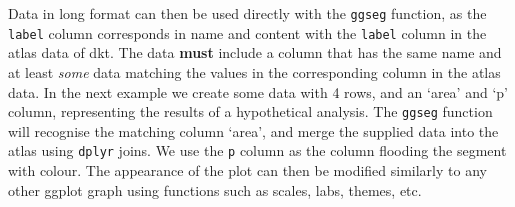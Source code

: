 \documentclass[fleqn,10pt]{wlpeerj} %
\newenvironment{Shaded}{\begin{snugshade}}{\end{snugshade}}
\newcommand{\CommentTok}[1]{\textcolor[rgb]{0.56,0.35,0.01}{\textit{#1}}}
\newcommand{\DataTypeTok}[1]{\textcolor[rgb]{0.13,0.29,0.53}{#1}}
\newcommand{\DecValTok}[1]{\textcolor[rgb]{0.00,0.00,0.81}{#1}}
\newcommand{\FloatTok}[1]{\textcolor[rgb]{0.00,0.00,0.81}{#1}}
\newcommand{\KeywordTok}[1]{\textcolor[rgb]{0.13,0.29,0.53}{\textbf{#1}}}
\newcommand{\NormalTok}[1]{#1}
\newcommand{\OperatorTok}[1]{\textcolor[rgb]{0.81,0.36,0.00}{\textbf{#1}}}
\newcommand{\StringTok}[1]{\textcolor[rgb]{0.31,0.60,0.02}{#1}}
\begin{document}
\begin{Shaded}
\end{Shaded}

Data in long format can then be used directly with the \texttt{ggseg} function, as the \texttt{label} column corresponds in name and content with the \texttt{label} column in the atlas data of dkt.
The data \textbf{must} include a column that has the same name and at least \emph{some} data matching the values in the corresponding column in the atlas data.
In the next example we create some data with 4 rows, and an `area' and `p' column, representing the results of a hypothetical analysis.
The \texttt{ggseg} function will recognise the matching column `area', and merge the supplied data into the atlas using \texttt{dplyr} joins.
We use the \texttt{p} column as the column flooding the segment with colour.
The appearance of the plot can then be modified similarly to any other ggplot graph using functions such as scales, labs, themes, etc.
\end{document}
